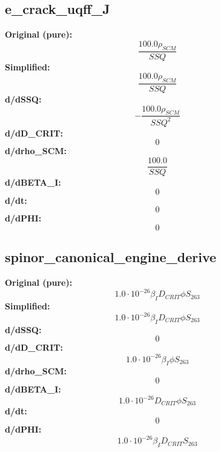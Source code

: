 \subsection{e_crack_uqff_J}
\textbf{Original (pure):}
\begin{equation}
\frac{100.0 \rho_{SCM}}{SSQ}
\end{equation}
\textbf{Simplified:}
\begin{equation}
\frac{100.0 \rho_{SCM}}{SSQ}
\end{equation}
\textbf{d/dSSQ:}
\begin{equation}
- \frac{100.0 \rho_{SCM}}{SSQ^{2}}
\end{equation}
\textbf{d/dD_CRIT:}
\begin{equation}
0
\end{equation}
\textbf{d/drho_SCM:}
\begin{equation}
\frac{100.0}{SSQ}
\end{equation}
\textbf{d/dBETA_I:}
\begin{equation}
0
\end{equation}
\textbf{d/dt:}
\begin{equation}
0
\end{equation}
\textbf{d/dPHI:}
\begin{equation}
0
\end{equation}

\subsection{spinor_canonical_engine_derive}
\textbf{Original (pure):}
\begin{equation}
1.0 \cdot 10^{-26} \beta_{I} D_{CRIT} \phi S_{26 3}
\end{equation}
\textbf{Simplified:}
\begin{equation}
1.0 \cdot 10^{-26} \beta_{I} D_{CRIT} \phi S_{26 3}
\end{equation}
\textbf{d/dSSQ:}
\begin{equation}
0
\end{equation}
\textbf{d/dD_CRIT:}
\begin{equation}
1.0 \cdot 10^{-26} \beta_{I} \phi S_{26 3}
\end{equation}
\textbf{d/drho_SCM:}
\begin{equation}
0
\end{equation}
\textbf{d/dBETA_I:}
\begin{equation}
1.0 \cdot 10^{-26} D_{CRIT} \phi S_{26 3}
\end{equation}
\textbf{d/dt:}
\begin{equation}
0
\end{equation}
\textbf{d/dPHI:}
\begin{equation}
1.0 \cdot 10^{-26} \beta_{I} D_{CRIT} S_{26 3}
\end{equation}

